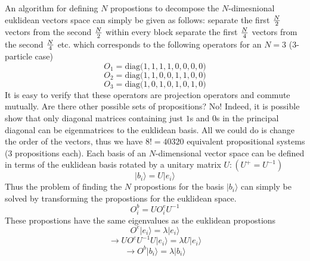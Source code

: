 An algorithm for defining $N$ propostions to decompose the $N$-dimesnional euklidean vectors space can simply be given as follows:
separate the first ${N \over 2}$ vectors from the second ${N \over 2}$
within every block separate the first ${N \over 4}$ vectors from the second ${N \over 4}$
etc. which corresponds to the following operators for an $N=3$ (3-particle case)
\begin{equation}
O_1=\textrm{diag}\Big(1,1,1,1,0,0,0,0\Big)
\end{equation}
\begin{equation}
O_2=\textrm{diag}\Big(1,1,0,0,1,1,0,0\Big)
\end{equation}
\begin{equation}
O_3=\textrm{diag}\Big(1,0,1,0,1,0,1,0\Big)
\end{equation}
It is easy to verify that these operators are projection operators and commute mutually. Are there other possible sets of propositions? No! Indeed, it is possible show that only diagonal matrices containing just $1$s and $0$s in the principal diagonal can be eigenmatrices to the euklidean basis. All we could do is change the order of the vectors, thus we have $8!=40320$ equivalent propositional systems (3 propositions each).
\newline
\newline
Each basis of an $N$-dimensional vector space can be defined in terms of the euklidean basis rotated by a unitary matrix $U: (U^+=U^{-1})$
\begin{equation}
|b_i\rangle=U |e_i\rangle
\end{equation}
Thus the problem of finding the $N$ propostions for the basis $|b_i\rangle$ can simply be solved by transforming the propostions for the euklidean space.
\begin{equation}
O^b_i=U O^e_i U^{-1}
\end{equation}
These propostions have the same eigenvalues as the euklidean propostions
\begin{equation}
O^e |e_i\rangle = \lambda |e_i \rangle
\end{equation}
\begin{equation}
\to U O^e U^{-1} U |e_i \rangle = \lambda U |e_i \rangle
\end{equation}
\begin{equation}
\to O^b |b_i \rangle = \lambda |b_i \rangle
\end{equation}


